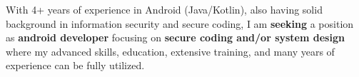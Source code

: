 

\begin{cvparagraph}


With 4+ years of experience in Android (Java/Kotlin), also having solid background in information security and secure coding, I am \textbf{seeking} a position as \textbf{android developer} focusing on \textbf{secure coding and/or system design} where my advanced skills, education, extensive training, and many years of experience can be fully utilized.

\end{cvparagraph}

